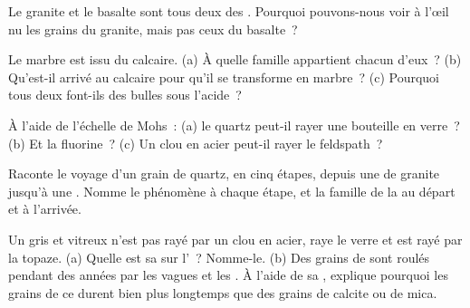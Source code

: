 \begin{exercise}[$\star\star$]\label{exo:g6:rocks-and-minerals:8}
Le granite et le basalte sont tous deux des . Pourquoi
pouvons-nous voir à l'œil nu les grains du granite, mais pas ceux du
basalte~?
\end{exercise}

\begin{exercise}[$\star\star$]\label{exo:g6:rocks-and-minerals:9}
Le marbre est issu du calcaire. (a) À quelle famille appartient chacun
d'eux~? (b) Qu'est-il arrivé au calcaire pour qu'il se transforme en
marbre~? (c) Pourquoi tous deux font-ils des bulles sous l'acide~?
\end{exercise}

\begin{exercise}[$\star\star$]\label{exo:g6:rocks-and-minerals:10}
À l'aide de l'échelle de Mohs~: (a) le quartz peut-il rayer une bouteille
en verre~? (b) Et la fluorine~? (c) Un clou en acier peut-il rayer le
feldspath~?
\end{exercise}

\begin{exercise}[$\star\star\star$]\label{exo:g6:rocks-and-minerals:11}
Raconte le voyage d'un grain de quartz, en cinq étapes, depuis une 
de granite jusqu'à une . Nomme le phénomène à chaque
étape, et la famille de la  au départ et à l'arrivée.
\end{exercise}

\begin{exercise}[$\star\star\star$]\label{exo:g6:rocks-and-minerals:12}
Un  gris et vitreux n'est pas rayé par un clou en acier, raye le
verre et est rayé par la topaze. (a) Quelle est sa  sur l'~? Nomme-le. (b) Des grains de  sont roulés pendant des années par
les vagues et les . À l'aide de sa , explique pourquoi les
grains de ce  durent bien plus longtemps que des grains de calcite
ou de mica.
\end{exercise}

